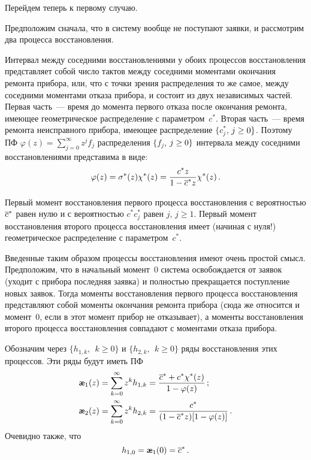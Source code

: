 \begin{multicols}{2}
Перейдем теперь к первому случаю.

Предположим сначала, что в сис\-те\-му вообще не поступают
заявки, и рассмотрим два процесса восстановления.

Интервал между соседними восстановлениями у обоих процессов
восстановления представляет собой число тактов между соседними
моментами окончания ремонта прибора, или, что с точки зрения
распределения то же самое, между соседними моментами отказа
прибора, и состоит из двух независимых частей.
Первая часть~--- время до момента первого отказа после
окончания ремонта, имеющее геометрическое распределение с
па\-ра\-мет\-ром~$c^*$.
Вторая часть~--- время ремонта неисправного прибора, имеющее
распределение $\{c^*_j$, $j\hm \ge 0\}$.
Поэтому ПФ
$\varphi(z)=\sum\limits_{j=0}^{\infty} z^j f_j$
распределения
$\{f_j$, $j\hm \ge 0\}$ интервала между соседними восстановлениями
представима в виде:
\begin{equation*}
\label{phi}
\varphi(z) = \sigma^*(z) \chi^*(z) =\displaystyle\frac{\displaystyle c^* z\mathstrut}{\displaystyle 1 - \overline c^* z\mathstrut} \chi^*(z)\,.
\end{equation*}

Первый момент восстановления первого процесса восстановления
с вероятностью $\overline c^*$ равен нулю
и с вероятностью $c^* c^*_j$ равен $j$, $j\ge 1$.
Первый момент восстановления второго процесса восстановления
имеет (начиная с нуля!) геометрическое распределение с
параметром~$c^*$.

Введенные таким образом процессы вос\-ста\-нов\-ле\-ния имеют очень
простой смысл.
Предположим, что в начальный момент~0 система освобождается
от заявок (уходит с прибора последняя заявка) и полностью
прекращается поступление новых заявок.
Тогда моменты восстановления первого процесса восстановления
представляют собой моменты окончания ремонта прибора (сюда
же относится и момент~0, если в этот момент прибор не
отказывает), а моменты восстановления второго процесса
восстановления совпадают с моментами отказа прибора.

Обозначим через $\{h_{1,k},\ \ k\ge0\}$ и
$\{h_{2,k},\ \ k\ge0\}$ ряды восстановления этих процессов.
Эти ряды будут иметь ПФ
\begin{align*}
{\slae}_{1}(z) &= \sum_{k=0}^{\infty} z^k h_{1,k} =
\fr{\oc^* + c^* \chi^*(z) }{1-\varphi(z)}\,;
\\
{\slae}_{2}(z) &= \sum_{k=0}^{\infty} z^k h_{2,k}
= \fr{c^*}{(1-\oc^* z) [1-\varphi(z)]}\,.
\end{align*}
Очевидно также, что
\begin{equation*}
\label{ae0}
h_{1,0} = {\slae}_{1}(0) = \oc^*\,.
\end{equation*}


\end{multicols}
